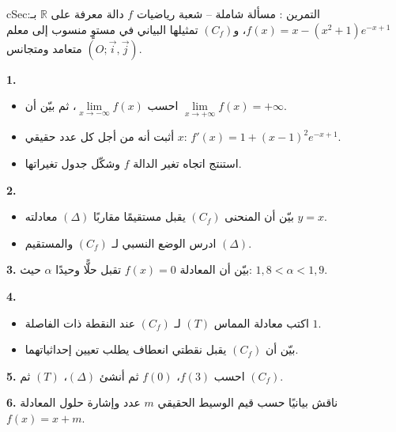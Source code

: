 \documentclass[12pt,a4paper]{article}
\newenvironment{BOX}[2]{\begin{otherlanguage}{english}\begin{arbox}{#1}{#2}}{\end{arbox}\end{otherlanguage}}
\newcounter{exo}
\newenvironment{tamrin}[1]{\stepcounter{exo}\begin{BOX}{cSec}{التمرين \theexo: #1}}{\end{BOX}}
\newcommand{\R}{\mathbb{R}}
\newenvironment{sq}{\begin{itemize}[leftmargin=2.4em,itemsep=3pt]}{\end{itemize}}
\newcommand{\qa}{\item[(أ)]}\newcommand{\qb}{\item[(ب)]}\newcommand{\qc}{\item[(جـ)]}\newcommand{\qd}{\item[(د)]}\newcommand{\qe}{\item[(هـ)]}
\newcommand{\QQ}[1]{\par\smallskip\textbf{#1.} }
\begin{document}
\begin{tamrin}{مسألة شاملة -- شعبة رياضيات}
$f$ دالة معرفة على $\R$ بـ: $f(x)=x-(x^2+1)e^{-x+1}$، و$(C_f)$ تمثيلها البياني في مستوٍ منسوب إلى معلم متعامد ومتجانس $(O;\vec i,\vec j)$.
\QQ{1}
\begin{sq}
\qa احسب $\lim\limits_{x\to-\infty}f(x)$، ثم بيّن أن $\lim\limits_{x\to+\infty}f(x)=+\infty$.
\qb أثبت أنه من أجل كل عدد حقيقي $x$: $f'(x)=1+(x-1)^2e^{-x+1}$.
\qc استنتج اتجاه تغير الدالة $f$ وشكّل جدول تغيراتها.
\end{sq}
\QQ{2}
\begin{sq}
\qa بيّن أن المنحنى $(C_f)$ يقبل مستقيمًا مقاربًا $(\Delta)$ معادلته $y=x$.
\qb ادرس الوضع النسبي لـ $(C_f)$ والمستقيم $(\Delta)$.
\end{sq}
\QQ{3} بيّن أن المعادلة $f(x)=0$ تقبل حلًّا وحيدًا $\alpha$ حيث: $1{,}8<\alpha<1{,}9$.
\QQ{4}
\begin{sq}
\qa اكتب معادلة المماس $(T)$ لـ $(C_f)$ عند النقطة ذات الفاصلة $1$.
\qb بيّن أن $(C_f)$ يقبل نقطتي انعطاف يطلب تعيين إحداثياتهما.
\end{sq}
\QQ{5} احسب $f(3)$، $f(0)$ ثم أنشئ $(\Delta)$، $(T)$ ثم $(C_f)$.
\QQ{6} ناقش بيانيًا حسب قيم الوسيط الحقيقي $m$ عدد وإشارة حلول المعادلة $f(x)=x+m$.
\end{tamrin}
\end{document}
